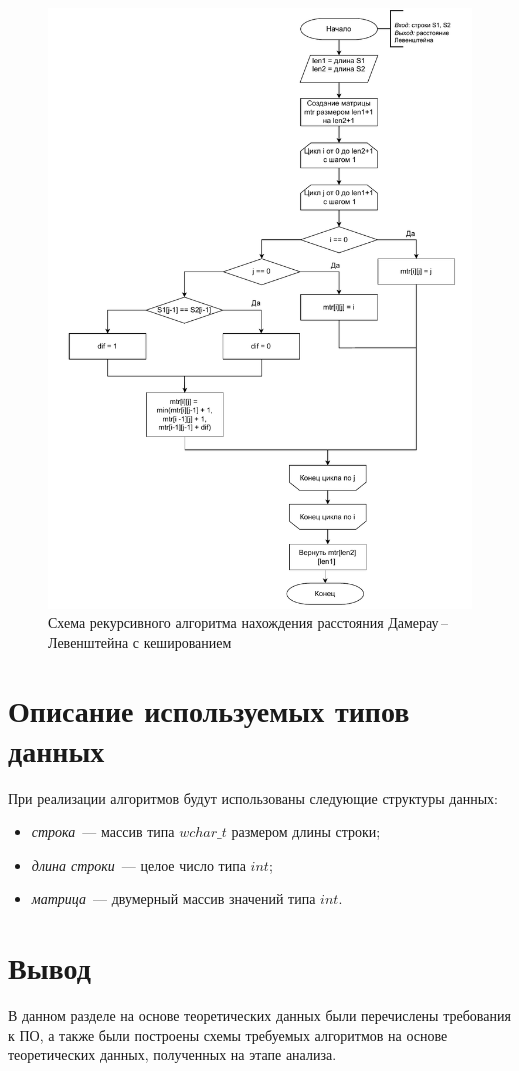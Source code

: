 \begin{figure}[h]
	\centering
	\includegraphics[height=0.9\textheight, page=5]{img/algorithms.pdf}
	\caption{Схема рекурсивного алгоритма нахождения расстояния Дамерау\,--\,Левенштейна с кешированием}
	\label{fig:DLrechash}
\end{figure}

\clearpage

\section{Описание используемых типов данных}

При реализации алгоритмов будут использованы следующие структуры данных:

\begin{itemize}
	\item \textit{строка}~--- массив типа $wchar{\_}t$ размером длины строки;
	\item \textit{длина строки}~--- целое число типа $int$;
	\item \textit{матрица}~--- двумерный массив значений типа $int$.
\end{itemize}

\section*{Вывод}

В данном разделе на основе теоретических данных были перечислены требования к ПО, а также были построены схемы требуемых алгоритмов на основе теоретических данных, полученных на этапе анализа.